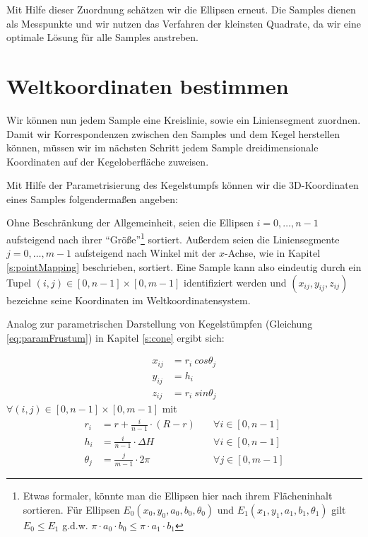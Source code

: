 Mit Hilfe dieser Zuordnung schätzen wir die Ellipsen erneut. Die Samples dienen als Messpunkte und wir nutzen das Verfahren der kleinsten Quadrate, da wir eine optimale Lösung für alle Samples anstreben.

\section{Weltkoordinaten bestimmen}
Wir können nun jedem Sample eine Kreislinie, sowie ein Liniensegment zuordnen. Damit wir Korrespondenzen zwischen den Samples und dem Kegel herstellen können, müssen wir im nächsten Schritt jedem Sample dreidimensionale Koordinaten auf der Kegeloberfläche zuweisen.

Mit Hilfe der Parametrisierung des Kegelstumpfs können wir die 3D-Koordinaten eines Samples folgendermaßen angeben:

Ohne Beschränkung der Allgemeinheit, seien die Ellipsen $i = 0,\dotsc,n - 1$ aufsteigend nach ihrer "`Größe"'\footnote{Etwas formaler, könnte man die Ellipsen hier nach ihrem Flächeninhalt sortieren. Für Ellipsen $E_0(x_0,y_0,a_0, b_0, \theta_0)$ und $E_1(x_1,y_1,a_1, b_1,\theta_1)$ gilt $E_0 \leq E_1$ g.d.w. $\pi\cdot a_0 \cdot b_0 \leq \pi \cdot a_1 \cdot b_1$} sortiert.
Außerdem seien die Liniensegmente $j = 0,\dotsc,m - 1$ aufsteigend nach Winkel mit der $x$-Achse, wie in Kapitel \ref{s:pointMapping} beschrieben, sortiert.
Eine Sample kann also eindeutig durch ein Tupel $(i,j) \in [0,n-1]\times [0,m-1]$ identifiziert werden und $(x_{ij},y_{ij},z_{ij})$ bezeichne seine Koordinaten im Weltkoordinatensystem.

Analog zur parametrischen Darstellung von Kegelstümpfen (Gleichung \ref{eq:paramFrustum}) in Kapitel \ref{s:cone} ergibt sich:

\[
\begin{aligned}
x_{ij} &= r_i~cos \theta_j \\
y_{ij} &= h_i\\
z_{ij} &= r_i~sin \theta_j
\end{aligned}
\]
$\forall (i,j) \in [0,n-1]\times [0,m-1]$ mit
\[
\begin{aligned}
r_i &= r + \frac{i}{n - 1}\cdot(R - r) \quad&\forall i\in[0,n-1]\\
h_i &= \frac{i}{n - 1}\cdot\Delta H &\forall i\in[0,n-1]\\
\theta_j &= \frac{j}{m-1} \cdot  2\pi  &\forall j\in[0,m-1]
\end{aligned}
\]



